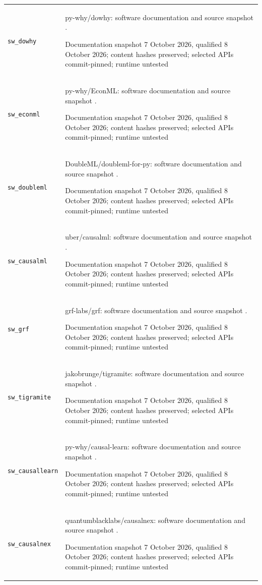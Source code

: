 \begin{longtable}{P{32mm}P{112mm}}
{\scriptsize\texttt{sw\_dowhy}} & py-why/dowhy: software documentation and source snapshot \citep{sw_dowhy}.\par Documentation snapshot 7 October 2026, qualified 8 October 2026; content hashes preserved; selected APIs commit-pinned; runtime untested\\
{\scriptsize\texttt{sw\_econml}} & py-why/EconML: software documentation and source snapshot \citep{sw_econml}.\par Documentation snapshot 7 October 2026, qualified 8 October 2026; content hashes preserved; selected APIs commit-pinned; runtime untested\\
{\scriptsize\texttt{sw\_doubleml}} & DoubleML/doubleml-for-py: software documentation and source snapshot \citep{sw_doubleml}.\par Documentation snapshot 7 October 2026, qualified 8 October 2026; content hashes preserved; selected APIs commit-pinned; runtime untested\\
{\scriptsize\texttt{sw\_causalml}} & uber/causalml: software documentation and source snapshot \citep{sw_causalml}.\par Documentation snapshot 7 October 2026, qualified 8 October 2026; content hashes preserved; selected APIs commit-pinned; runtime untested\\
{\scriptsize\texttt{sw\_grf}} & grf-labs/grf: software documentation and source snapshot \citep{sw_grf}.\par Documentation snapshot 7 October 2026, qualified 8 October 2026; content hashes preserved; selected APIs commit-pinned; runtime untested\\
{\scriptsize\texttt{sw\_tigramite}} & jakobrunge/tigramite: software documentation and source snapshot \citep{sw_tigramite}.\par Documentation snapshot 7 October 2026, qualified 8 October 2026; content hashes preserved; selected APIs commit-pinned; runtime untested\\
{\scriptsize\texttt{sw\_causallearn}} & py-why/causal-learn: software documentation and source snapshot \citep{sw_causallearn}.\par Documentation snapshot 7 October 2026, qualified 8 October 2026; content hashes preserved; selected APIs commit-pinned; runtime untested\\
{\scriptsize\texttt{sw\_causalnex}} & quantumblacklabs/causalnex: software documentation and source snapshot \citep{sw_causalnex}.\par Documentation snapshot 7 October 2026, qualified 8 October 2026; content hashes preserved; selected APIs commit-pinned; runtime untested\\

\end{longtable}

